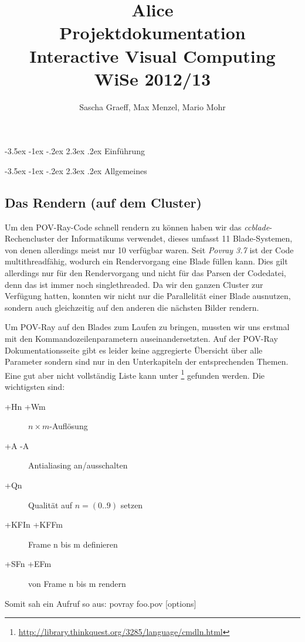 \documentclass[twocolumn]{article}
\author{Sascha Graeff, Max Menzel, Mario Mohr}
\title{Alice \\ \small Projektdokumentation \\ Interactive Visual Computing \\ WiSe 2012/13}
\makeatletter
\renewcommand\section{\@startsection{section}{1}{\z@}%
                                      {-3.5ex \@plus -1ex \@minus -.2ex}%
                                      {2.3ex \@plus.2ex}%
                                      {\normalfont\large\bfseries}}
\makeatother
\begin{document}
\maketitle



\section{Einführung}

\section{Allgemeines}
\subsection{Das Rendern (auf dem Cluster)} %
Um den POV-Ray-Code schnell rendern zu können haben wir das \textit{ccblade}-Rechencluster der Informatikums verwendet, dieses umfasst 11 Blade-Systemen, von denen allerdings meist nur 10 verfügbar waren.
Seit \textit{Povray 3.7} ist der Code multithreadfähig, wodurch ein Rendervorgang eine Blade füllen kann. Dies gilt allerdings nur für den Rendervorgang und nicht für das Parsen der Codedatei, denn das ist immer noch singlethreaded.
Da wir den ganzen Cluster zur Verfügung hatten, konnten wir nicht nur die Parallelität einer Blade ausnutzen, sondern auch gleichzeitig auf den anderen die nächsten Bilder rendern. 

Um POV-Ray auf den Blades zum Laufen zu bringen, mussten wir uns erstmal mit den Kommandozeilenparametern auseinandersetzten. Auf der POV-Ray Dokumentationsseite gibt es leider keine aggregierte Übersicht über alle Parameter sondern sind nur in den Unterkapiteln der entsprechenden Themen. Eine gut aber nicht vollständig Liste kann unter \footnote{\label{foot:cmdLink}\url{http://library.thinkquest.org/3285/language/cmdln.html}} gefunden werden. Die wichtigsten sind:
\begin{description}
\item[+Hn +Wm] $n\times{}m$-Auflösung
\item[+A -A]Antialiasing an/ausschalten
\item[+Qn] Qualität auf $n = (0 .. 9)$ setzen
\item[+KFIn +KFFm] Frame n bis m definieren
\item[+SFn +EFm] von Frame n bis m rendern 
\end{description}
Somit sah ein Aufruf so aus:  povray foo.pov  [options]
\end{document}
